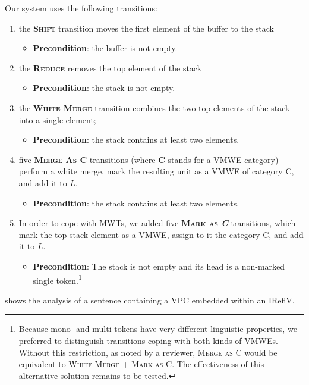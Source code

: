 \documentclass[output=paper,modfonts]{langscibook}
\begin{document}
Our system uses the following transitions: 
\begin{enumerate}
\item the \textsc{\textbf{Shift}} transition moves the first element of the buffer to the stack
\begin{itemize}
\item[] \textbf{Precondition}: the buffer is not empty.
\end{itemize}
\item the \textsc{\textbf{Reduce}} removes the top element of the stack
\begin{itemize}
\item[] \textbf{Precondition}: the stack is not empty.
\end{itemize}
\item the \textbf{\textsc{White Merge}} transition combines the two top elements of the stack into a single element;  
\begin{itemize}
\item[] \textbf{Precondition}: the stack contains at least two elements.
\end{itemize}
\item five \textsc{\textbf{Merge As \textbf{C}}} transitions (where \textbf{C} stands for a VMWE category) perform a white merge, mark the resulting unit as a VMWE of category \textsc{C}, and add it to $L$.
\begin{itemize}
\item[] \textbf{Precondition}: the stack contains at least two elements.
\end{itemize}
\item In order to cope with MWTs, we added five \textsc{\textbf{Mark as \emph{C}}} transitions, which mark the top stack element as a VMWE, assign to it the category \textsc{C}, and add it to $L$.
\begin{itemize}
\item[] \textbf{Precondition}: The stack is not empty and its head is a non-marked single token.\footnote{Because mono- and multi-tokens have very different linguistic properties, we preferred to distinguish transitions coping with both kinds of VMWEs. Without this restriction, as noted by a reviewer, \textsc{Merge as C} would be equivalent to \textsc{White Merge + Mark as C}. The effectiveness of this alternative solution remains to be tested.}
\end{itemize}
\end{enumerate}
 shows the analysis of a  sentence containing a  VPC embedded within an IReflV.
\end{document}
